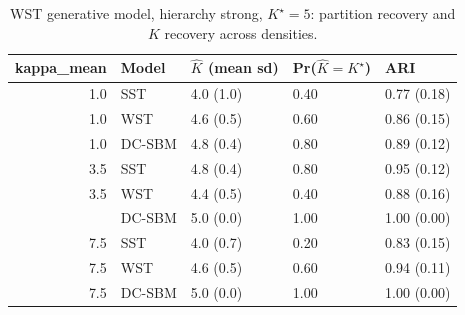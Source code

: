 \begin{table}
\centering
\caption{WST generative model, hierarchy strong, $K^\star=5$: partition recovery and $K$ recovery across densities.}
\centering
\begin{tabular}[t]{rllll}
\toprule
kappa_mean & Model & $\hat K$ (mean sd) & Pr($\hat K = K^\star$) & ARI\\
\midrule
1.0 & SST & 4.0 (1.0) & 0.40 & 0.77 (0.18)\\
1.0 & WST & 4.6 (0.5) & 0.60 & 0.86 (0.15)\\
1.0 & DC-SBM & 4.8 (0.4) & 0.80 & 0.89 (0.12)\\
3.5 & SST & 4.8 (0.4) & 0.80 & 0.95 (0.12)\\
3.5 & WST & 4.4 (0.5) & 0.40 & 0.88 (0.16)\\
\addlinespace
3.5 & DC-SBM & 5.0 (0.0) & 1.00 & 1.00 (0.00)\\
7.5 & SST & 4.0 (0.7) & 0.20 & 0.83 (0.15)\\
7.5 & WST & 4.6 (0.5) & 0.60 & 0.94 (0.11)\\
7.5 & DC-SBM & 5.0 (0.0) & 1.00 & 1.00 (0.00)\\
\bottomrule
\end{tabular}
\end{table}
